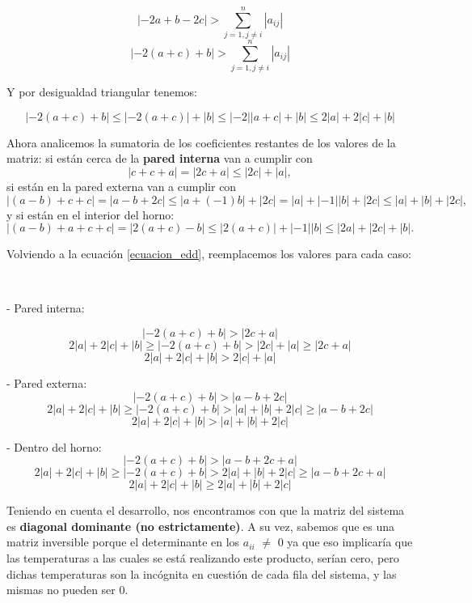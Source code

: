 \begin{equation*}
     | -2a +b - 2c | > 
\sum_{j=1, j \neq i}^{n} |a_{ij}| 
\end{equation*}
\begin{equation*}
     | -2(a+c) + b | > 
\sum_{j=1, j \neq i}^{n} |a_{ij}| 
\end{equation*}

Y por desigualdad triangular tenemos:

\begin{equation*}
     | -2(a+c) + b | \leq | -2(a+c)| + | b | \leq |-2| |a+c| + | b | \leq 2|a|+ 2|c| +|b|
\end{equation*}

Ahora analicemos la sumatoria de los coeficientes restantes de los valores de la matriz: si están cerca de la  \textbf{pared interna} van a cumplir con
\begin{equation*}
    |c + c +a | =|2c +a | \leq |2c| + |a|, 
\end{equation*}
si están en la pared externa van a cumplir con 
\begin{equation*}
    | (a-b)  +  c + c | = | a-b + 2c | \leq |  a + (-1)b | + | 2c | = |a|+|-1||b| + |2c| \leq |a| + |b| + |2c|,
\end{equation*}
y si están en el interior del horno:
\begin{equation*}
    | (a - b) + a + c + c | = | 2 (a+c) -b | \leq |2(a+c)| + |-1| |b| \leq | 2a | + |2c| + |b| .
\end{equation*}


\noindent Volviendo a la ecuación \ref{ecuacion_edd}, reemplacemos los valores para cada caso: 

\

- Pared interna:

\[
 | -2(a+c) + b | > |2c + a|
\]
\[
2|a|+ 2|c| +|b| \geq | -2(a+c) + b | > |2c| + |a| \geq |2c + a|
\]
\[
2|a|+ 2|c| +|b| > 2|c| + |a| 
\]

- Pared  externa:
\[
 | -2(a+c) + b | > | a - b + 2c |
\]
\[
2|a|+ 2|c| +|b| \geq | -2(a+c) + b | > | a| + | b | + 2|c | \geq | a - b + 2c |
\]
\[
2|a|+ 2|c| +|b| > | a| + | b | + 2|c | 
\]
    
- Dentro del horno:
\[
 | -2(a+c) + b | > | a - b + 2c + a |
\]
\[
2|a|+ 2|c| +|b| \geq | -2(a+c) + b | > 2| a| + | b | + 2|c | \geq | a - b + 2c + a |
\]
\[
2|a|+ 2|c| +|b| \geq 2| a| + | b | + 2|c | 
\]

Teniendo en cuenta el desarrollo, nos encontramos con que la matriz del sistema es \textbf{diagonal dominante (no estrictamente)}. A su vez, sabemos que es una matriz inversible porque el determinante en los $a_{ii}$ $\neq$ 0 ya que eso implicaría que las temperaturas a las cuales se está realizando este producto, serían cero, pero dichas temperaturas son la incógnita en cuestión de cada fila del sistema, y las mismas no pueden ser 0.

